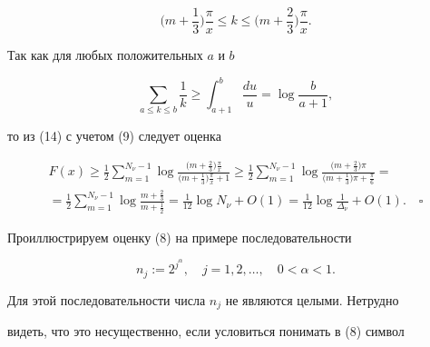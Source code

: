 $$


\bigg ( m + \frac{1}{3} \bigg ) \frac{\pi}{x} \le k \le


\bigg ( m + \frac{2}{3} \bigg ) \frac{\pi}{x}.


$$


Так как для любых положительных $a$ и $b$


$$


\sum_{a \le k \le b} \frac{1}{k} \ge \int_{a + 1}^b \frac{du}{u} =


\log \frac{b}{a + 1},


$$


то из (14) с учетом (9) следует оценка


\begin{multline*}


F(x) \ge \frac{1}{2} \sum_{m = 1}^{N_{\nu} - 1} \log


\frac{ \big ( m + \frac{2}{3} \big ) \frac{\pi}{x}}


{ \big ( m + \frac{1}{3} \big ) \frac{\pi}{x} + 1} \ge


\frac{1}{2} \sum_{m = 1}^{N_{\nu} - 1} \log


\frac{ \big ( m + \frac{2}{3} \big ) \pi}


{ \big ( m + \frac{1}{3} \big ) \pi + \frac{\pi}{6}} =\\


%


= \frac{1}{2} \sum_{m = 1}^{N_{\nu} - 1} \log


\frac{m + \frac{2}{3}}


{m + \frac{1}{2}} = \frac{1}{12} \log N_{\nu} + O(1) =


\frac{1}{12} \log \frac{1}{\Delta_{\nu}} + O(1).\quad\square


\end{multline*}





Проиллюстрируем оценку (8) на примере последовательности


\begin{equation}


n_j := 2^{j^{\alpha}}, \quad j = 1, 2, \dotsc, \quad 0 < \alpha < 1.


\end{equation}


Для этой последовательности числа $n_j$ не являются целыми. Нетрудно


видеть, что это несущественно, если условиться понимать в (8) символ


